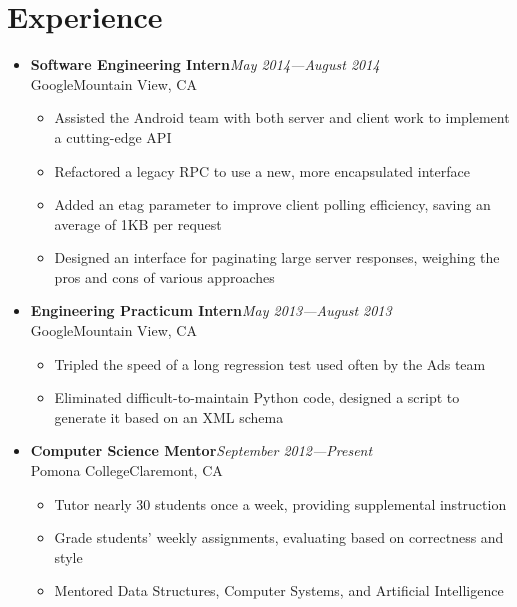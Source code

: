 \documentclass[10pt]{article}
\newcommand\experienceentry[4]{{
        \textbf{#3}\hfill\textit{#4} \\
        #1\hfill#2
}}
\begin{document}
\section*{Experience}
\begin{itemize}[label=,leftmargin=0]
    \item \experienceentry{Google}{Mountain View, CA}
        {Software Engineering Intern}{May 2014---August 2014}
        \begin{itemize}[topsep=4pt]
            \item Assisted the Android team with both server and client work to
                implement a cutting-edge API
            \item Refactored a legacy RPC to use a new, more encapsulated
                interface
            \item Added an etag parameter to improve client polling efficiency,
                saving an average of 1KB per request
            \item Designed an interface for paginating large server responses,
                weighing the pros and cons of various approaches
        \end{itemize}
    \item \experienceentry{Google}{Mountain View, CA}
        {Engineering Practicum Intern}{May 2013---August 2013}
        \begin{itemize}[topsep=4pt]
            \item Tripled the speed of a long regression test used often by the
                Ads team
            \item Eliminated difficult-to-maintain Python code, designed a script
                to generate it based on an XML schema
        \end{itemize}

    \item \experienceentry{Pomona College}{Claremont, CA}
        {Computer Science Mentor}{September 2012---Present}
        \begin{itemize}[topsep=4pt]
            \item Tutor nearly 30 students once a week, providing supplemental
                instruction
            \item Grade students' weekly assignments, evaluating
                based on correctness and style
            \item Mentored Data Structures, Computer Systems, and Artificial
                Intelligence
        \end{itemize}
\end{itemize}
\end{document}
